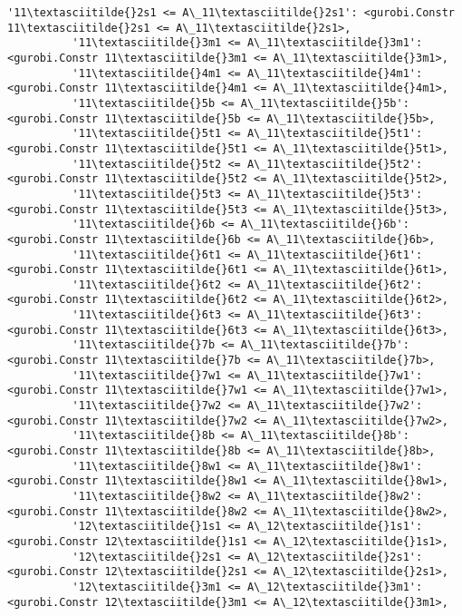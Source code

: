 \documentclass[11pt]{article}
\begin{document}
\begin{Verbatim}[commandchars=\\\{\}]
          '11\textasciitilde{}2s1 <= A\_11\textasciitilde{}2s1': <gurobi.Constr 11\textasciitilde{}2s1 <= A\_11\textasciitilde{}2s1>,
          '11\textasciitilde{}3m1 <= A\_11\textasciitilde{}3m1': <gurobi.Constr 11\textasciitilde{}3m1 <= A\_11\textasciitilde{}3m1>,
          '11\textasciitilde{}4m1 <= A\_11\textasciitilde{}4m1': <gurobi.Constr 11\textasciitilde{}4m1 <= A\_11\textasciitilde{}4m1>,
          '11\textasciitilde{}5b <= A\_11\textasciitilde{}5b': <gurobi.Constr 11\textasciitilde{}5b <= A\_11\textasciitilde{}5b>,
          '11\textasciitilde{}5t1 <= A\_11\textasciitilde{}5t1': <gurobi.Constr 11\textasciitilde{}5t1 <= A\_11\textasciitilde{}5t1>,
          '11\textasciitilde{}5t2 <= A\_11\textasciitilde{}5t2': <gurobi.Constr 11\textasciitilde{}5t2 <= A\_11\textasciitilde{}5t2>,
          '11\textasciitilde{}5t3 <= A\_11\textasciitilde{}5t3': <gurobi.Constr 11\textasciitilde{}5t3 <= A\_11\textasciitilde{}5t3>,
          '11\textasciitilde{}6b <= A\_11\textasciitilde{}6b': <gurobi.Constr 11\textasciitilde{}6b <= A\_11\textasciitilde{}6b>,
          '11\textasciitilde{}6t1 <= A\_11\textasciitilde{}6t1': <gurobi.Constr 11\textasciitilde{}6t1 <= A\_11\textasciitilde{}6t1>,
          '11\textasciitilde{}6t2 <= A\_11\textasciitilde{}6t2': <gurobi.Constr 11\textasciitilde{}6t2 <= A\_11\textasciitilde{}6t2>,
          '11\textasciitilde{}6t3 <= A\_11\textasciitilde{}6t3': <gurobi.Constr 11\textasciitilde{}6t3 <= A\_11\textasciitilde{}6t3>,
          '11\textasciitilde{}7b <= A\_11\textasciitilde{}7b': <gurobi.Constr 11\textasciitilde{}7b <= A\_11\textasciitilde{}7b>,
          '11\textasciitilde{}7w1 <= A\_11\textasciitilde{}7w1': <gurobi.Constr 11\textasciitilde{}7w1 <= A\_11\textasciitilde{}7w1>,
          '11\textasciitilde{}7w2 <= A\_11\textasciitilde{}7w2': <gurobi.Constr 11\textasciitilde{}7w2 <= A\_11\textasciitilde{}7w2>,
          '11\textasciitilde{}8b <= A\_11\textasciitilde{}8b': <gurobi.Constr 11\textasciitilde{}8b <= A\_11\textasciitilde{}8b>,
          '11\textasciitilde{}8w1 <= A\_11\textasciitilde{}8w1': <gurobi.Constr 11\textasciitilde{}8w1 <= A\_11\textasciitilde{}8w1>,
          '11\textasciitilde{}8w2 <= A\_11\textasciitilde{}8w2': <gurobi.Constr 11\textasciitilde{}8w2 <= A\_11\textasciitilde{}8w2>,
          '12\textasciitilde{}1s1 <= A\_12\textasciitilde{}1s1': <gurobi.Constr 12\textasciitilde{}1s1 <= A\_12\textasciitilde{}1s1>,
          '12\textasciitilde{}2s1 <= A\_12\textasciitilde{}2s1': <gurobi.Constr 12\textasciitilde{}2s1 <= A\_12\textasciitilde{}2s1>,
          '12\textasciitilde{}3m1 <= A\_12\textasciitilde{}3m1': <gurobi.Constr 12\textasciitilde{}3m1 <= A\_12\textasciitilde{}3m1>,

\end{Verbatim}
\end{document}
